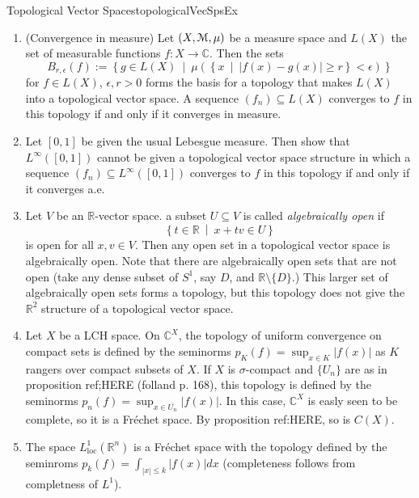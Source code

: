 \documentclass[oneside]{book}
\newcommand{\R}{\mathbb{R}}
\newcommand{\C}{\mathbb{C}}
\newcommand{\EM}{\EuScript{M}}
\newcommand{\sse}{\subseteq}
\newcommand{\oln}{\overline}
\newcommand{\set}[2]{\left\{#1 \ \middle|\ #2\right\}}
\begin{document}
\begin{example}{Topological Vector Spaces}{topologicalVecSpsEx}
\begin{enumerate}
			the $C^k$-norm on this space for any non-negative integer $k$ by the formula:
			\[
				\|f\|_{C^k} := \sum_{i=1}^k \sup_{x \in [0,1]} |f^{(i)}(x)|
			\]
			where $f^{(i)}$ is the $i$th derivative of $f$. The topology generated by all $C^k$ norms $k
			= 0,1,2,...,$ is the \emph{smooth topology}. A sequence $f_n$ converges in this topology
			to a limit $f$ if $f_n^{(i)}$ converges uniformally to $f^{(i)}$ for each $i \ge 0$. Is this
			a topological vector space?
		\item (Convergence in measure) Let $(X, \EM, \mu)$ be a measure space and $L(X)$ the set of measurable
			functions $f: X \to \C$. Then the sets
			\[
				B_{r, \epsilon}(f) := \set{g \in L(X)}{\mu(\set{x}{|f(x) - g(x)| \ge r}
				< \epsilon)}
			\]
			for $f \in L(X)$, $\epsilon, r > 0$ forms the basis for a topology that makes $L(X)$ into
			a topological vector space. A sequence $(f_n) \sse L(X)$ converges to $f$ in this topology if
			and only if it converges in measure.
		\item Let $[0,1]$ be given the usual Lebesgue measure. Then show that $L^\infty([0,1])$ cannot be
			given a topological vector space structure in which a sequence $(f_n) \sse L^\infty([0,1])$
			converges to $f$ in this topology if and only if it converges a.e.
		\item Let $V$ be an $\R$-vector space. a subset $U \sse V$ is called \emph{algebraically open} if
			\[
				\set{t\in \R}{x+tv \in U}
			\]
			is open for all $x,v \in V$. Then any open set in a topological
			vector space is algebraically open. Note that there are algebraically open sets that are not
			open (take any dense subset of $S^1$, say $D$, and $\R \setminus \{D\}$.) This larger set of
			algebraically open sets forms a topology, but this topology does not give the $\R^2$ structure
			of a topological vector space.
	\item Let $X$ be a LCH space. On $\C^X$, the topology of uniform convergence on compact sets is defined by the seminorms
		$p_K(f) = \sup_{x \in K} |f(x)|$ as $K$ rangers over compact subsets of $X$. If $X$ is $\sigma$-compact and $\{U_n\}$ are
		as in proposition ref;HERE (folland p. 168), this topology is defined by the seminorms $p_n(f) = \sup_{x \in
		\oln{U_n}} |f(x)|$. In this case, $\C^X$ is easly seen to be complete, so it is a Fr\'echet space. By proposition
		ref:HERE, so is $C(X)$.
	\item The space $L_{\text{loc}}^1(\R^n)$ is a Fr\'echet space with the topology defined by the seminroms $p_k(f)
		= \int_{|x| \le k}|f(x)|dx$ (completeness follows from completness of $L^1$).

\end{enumerate}
\end{example}
\end{document}
